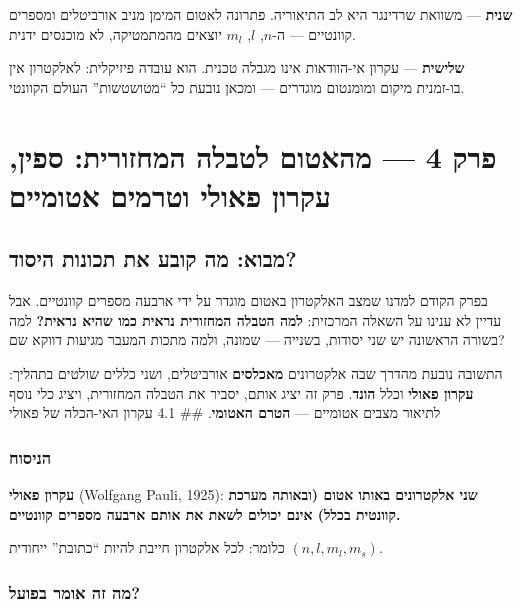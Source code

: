 \documentclass[
  hebrew,
  letterpaper,
  DIV=11,
  numbers=noendperiod]{scrreprt}
\begin{document}
\textbf{שנית} --- משוואת שרדינגר היא לב התיאוריה. פתרונה לאטום המימן
מניב אורביטלים ומספרים קוונטיים --- ה-\(n\), \(l\), \(m_l\) יוצאים
מהמתמטיקה, לא מוכנסים ידנית.

\textbf{שלישית} --- עקרון אי-הוודאות אינו מגבלה טכנית. הוא עובדה
פיזיקלית: לאלקטרון אין בו-זמנית מיקום ומומנטום מוגדרים --- ומכאן נובעת
כל ``מטושטשות'' העולם הקוונטי.


\chapter{פרק 4 --- מהאטום לטבלה המחזורית: ספין, עקרון פאולי וטרמים
אטומיים}\label{ux5e4ux5e8ux5e7-4-ux5deux5d4ux5d0ux5d8ux5d5ux5dd-ux5dcux5d8ux5d1ux5dcux5d4-ux5d4ux5deux5d7ux5d6ux5d5ux5e8ux5d9ux5ea-ux5e1ux5e4ux5d9ux5df-ux5e2ux5e7ux5e8ux5d5ux5df-ux5e4ux5d0ux5d5ux5dcux5d9-ux5d5ux5d8ux5e8ux5deux5d9ux5dd-ux5d0ux5d8ux5d5ux5deux5d9ux5d9ux5dd}

\section{מבוא: מה קובע את תכונות
היסוד?}\label{ux5deux5d1ux5d5ux5d0-ux5deux5d4-ux5e7ux5d5ux5d1ux5e2-ux5d0ux5ea-ux5eaux5dbux5d5ux5e0ux5d5ux5ea-ux5d4ux5d9ux5e1ux5d5ux5d3}

בפרק הקודם למדנו שמצב האלקטרון באטום מוגדר על ידי ארבעה מספרים קוונטיים.
אבל עדיין לא ענינו על השאלה המרכזית: \textbf{למה הטבלה המחזורית נראית
כמו שהיא נראית?} למה בשורה הראשונה יש שני יסודות, בשנייה --- שמונה, ולמה
מתכות המעבר מגיעות דווקא שם?

התשובה נובעת מהדרך שבה אלקטרונים \textbf{מאכלסים} אורביטלים, ושני כללים
שולטים בתהליך: \textbf{עקרון פאולי} וכלל \textbf{הונד}. פרק זה יציג
אותם, יסביר את הטבלה המחזורית, ויציג כלי נוסף לתיאור מצבים אטומיים ---
\textbf{הטרם האטומי}. \#\# 4.1 עקרון האי-הכלה של פאולי

\subsection{הניסוח}\label{ux5d4ux5e0ux5d9ux5e1ux5d5ux5d7-1}

\textbf{עקרון פאולי} (Wolfgang Pauli, 1925): \textbf{שני אלקטרונים באותו
אטום (ובאותה מערכת קוונטית בכלל) אינם יכולים לשאת את אותם ארבעה מספרים
קוונטיים.}

כלומר: לכל אלקטרון חייבת להיות ``כתובת'' ייחודית \((n, l, m_l, m_s)\).

\subsection{מה זה אומר
בפועל?}\label{ux5deux5d4-ux5d6ux5d4-ux5d0ux5d5ux5deux5e8-ux5d1ux5e4ux5d5ux5e2ux5dc-1}
\end{document}
